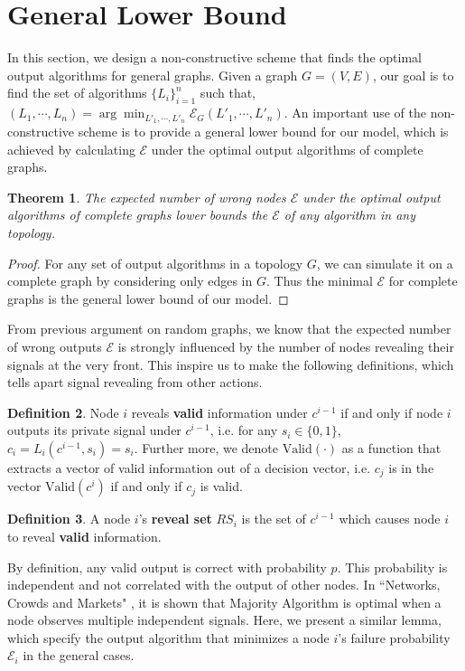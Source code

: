 \documentclass[a4paper,UKenglish]{lipics}
\newtheorem{thm}{Theorem}[section] %
\theoremstyle{definition}
\newtheorem{defn}[thm]{Definition}
\begin{document}
\section{General Lower Bound}
In this section, we design a non-constructive scheme that finds the optimal output algorithms for general graphs.
Given a graph $G = (V, E)$, our goal is to find the set of algorithms $\{L_i\}_{i=1}^{n}$ such that,
$
	(L_1, \dotsb, L_n)
=
	\arg\min_{L'_1, \dotsb, L'_n} \mathcal{E}_{G}(L'_1,\dotsb, L'_n).
$
An important use of the non-constructive scheme is to provide a general lower bound for our model,
	 which is achieved by calculating $\mathcal{E}$ under the optimal output algorithms of complete graphs.

\begin{thm}
\label{thm:complete graphs bound}
The expected number of wrong nodes $\mathcal{E}$ under the optimal output algorithms of complete graphs
	 lower bounds the $\mathcal{E}$ of any algorithm in any topology.
\end{thm}
\begin{proof}
For any set of output algorithms in a topology $G$, we can simulate it on a complete graph by considering only edges in $G$.
Thus the minimal $\mathcal{E}$ for complete graphs is the general lower bound of our model.
\end{proof}

From previous argument on random graphs,
	we know that the expected number of wrong outputs $\mathcal{E}$ is strongly influenced 
	by the number of nodes revealing their signals at the very front.
This inspire us to make the following definitions, which tells apart signal revealing from other actions.
\begin{defn}
Node $i$ reveals \textbf{valid} information under $c^{i-1}$ 
	if and only if node $i$ outputs its private signal under $c^{i-1}$, 
	i.e. for any $s_i\in \{0,1\}$, $c_i = L_i(c^{i-1}, s_i) = s_i$.
Further more, we denote $\text{Valid}(\cdot)$ as a function that extracts a vector of valid information out of a decision vector, i.e. 
	$c_j$ is in the vector $\text{Valid}(c^{i})$ if and only if $c_j$ is valid.
\end{defn}

\begin{defn}
A node $i$'s \textbf{reveal set} $RS_i$ is the set of $c^{i-1}$ which causes node $i$ to reveal \textbf{valid} information.
\end{defn}

By definition, any valid output is correct with probability $p$.
This probability is independent and not correlated with the output of other nodes.
In ``Networks, Crowds and Markets" \cite{easley2010networks},
	it is shown that Majority Algorithm is optimal when a node observes multiple independent signals.
Here, we present a similar lemma, which specify the output algorithm that minimizes a node $i$'s failure probability $\mathcal{E}_i$ in the general cases.
\end{document}
